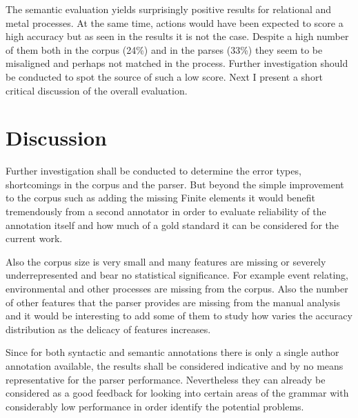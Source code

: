 The semantic evaluation yields surprisingly positive results for relational and metal processes. At the same time, actions would have been expected to score a high accuracy but as seen in the results it is not the case. Despite a high number of them both in the corpus (24\%) and in the parses (33\%) they seem to be misaligned and perhaps not matched in the process. Further investigation should be conducted to spot the source of such a low score. Next I present a short critical discussion of the overall evaluation. 

\section{Discussion}
\label{sec:evaluation-discussion}
Further investigation shall be conducted to determine the error types, shortcomings in the corpus and the parser. But beyond the simple improvement to the corpus such as adding the missing Finite elements it would benefit tremendously from a second annotator in order to evaluate reliability of the annotation itself and how much of a gold standard it can be considered for the current work. 

Also the corpus size is very small and many features are missing or severely underrepresented and bear no statistical significance. For example event relating, environmental and other processes are missing from the corpus. Also the number of other features that the parser provides are missing from the manual analysis and it would be interesting to add some of them to study how varies the accuracy distribution as the delicacy of features increases. 

Since for both syntactic and semantic annotations there is only a single author annotation available, the results shall be considered indicative and by no means representative for the parser performance. Nevertheless they can already be considered as a good feedback for looking into certain areas of the grammar with considerably low performance in order identify the potential problems. 
